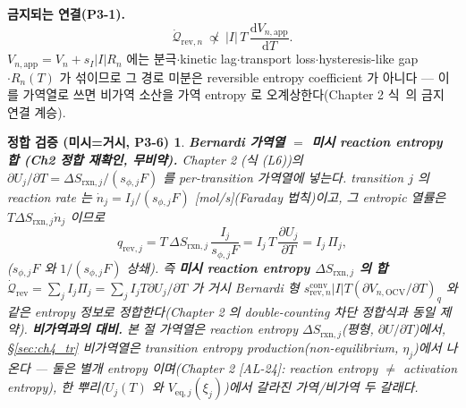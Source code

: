 \documentclass[11pt,a4paper]{article}
\newtheorem*{verifybox}{정합 검증 (미시=거시, P3-6)}
\newcommand{\dd}{\mathrm{d}}
\newcommand{\eq}{\mathrm{eq}}
\newcommand{\app}{\mathrm{app}}
\newcommand{\OCV}{\mathrm{OCV}}
\newcommand{\rev}{\mathrm{rev}}
\newcommand{\rxn}{\mathrm{rxn}}
\newcommand{\conv}{\mathrm{conv}}
\newcommand{\AL}[1]{\textsf{[AL-#1]}}
\begin{document}
\textbf{금지되는 연결(P3-1).}
\begin{equation}
\dot{\mathcal Q}_{\rev,n}\ \not\propto\ |I|\,T\,\frac{\dd V_{n,\app}}{\dd T}.
\label{eq:ch4_forbid}
\end{equation}
$V_{n,\app}=V_n+s_I|I|R_n$ 에는 분극$\cdot$kinetic lag$\cdot$transport loss$\cdot$hysteresis-like gap$\cdot R_n(T)$
가 섞이므로 그 경로 미분은 reversible entropy coefficient 가 아니다 — 이를 가역열로 쓰면 비가역 소산을 가역
entropy 로 오계상한다(Chapter 2 식~의 금지 연결 계승).

\begin{verifybox}
\textbf{Bernardi 가역열 $=$ 미시 reaction entropy 합 (Ch2 정합 재확인, 무비약).} Chapter 2 (식 (L6))의
$\partial U_j/\partial T=\Delta S_{\rxn,j}/(s_{\phi,j}F)$ 를 per-transition 가역열에 넣는다. transition $j$ 의
reaction rate 는 $\dot n_j=I_j/(s_{\phi,j}F)$ [mol/s](Faraday 법칙)이고, 그 entropic 열률은 $T\Delta S_{\rxn,j}\dot n_j$
이므로
\begin{equation}
q_{\rev,j}=T\,\Delta S_{\rxn,j}\,\frac{I_j}{s_{\phi,j}F}
=I_j\,T\,\frac{\partial U_j}{\partial T}=I_j\,\Pi_j,
\label{eq:ch4_qrev_micro}
\end{equation}
($s_{\phi,j}F$ 와 $1/(s_{\phi,j}F)$ 상쇄). 즉 \textbf{미시 reaction entropy $\Delta S_{\rxn,j}$ 의 합}
$\dot{\mathcal Q}_{\rev}=\sum_j I_j\Pi_j=\sum_j I_j T\partial U_j/\partial T$ 가 거시 Bernardi 형
$s_{\rev,n}^{\conv}|I|T(\partial V_{n,\OCV}/\partial T)_q$ 와 같은 entropy 정보로 정합한다(Chapter 2 의
double-counting 차단 정합식과 동일 제약). \textbf{비가역과의 대비.} 본 절 가역열은 \emph{reaction} entropy
$\Delta S_{\rxn,j}$(평형, $\partial U/\partial T$)에서, \S\ref{sec:ch4_tr} 비가역열은 transition entropy
production(non-equilibrium, $\eta_j$)에서 나온다 — 둘은 별개 entropy 이며(Chapter 2 \AL{24}: reaction entropy
$\ne$ activation entropy), 한 뿌리($U_j(T)$ 와 $V_{\eq,j}(\xi_j)$)에서 갈라진 가역/비가역 두 갈래다.
\end{verifybox}

\end{document}
